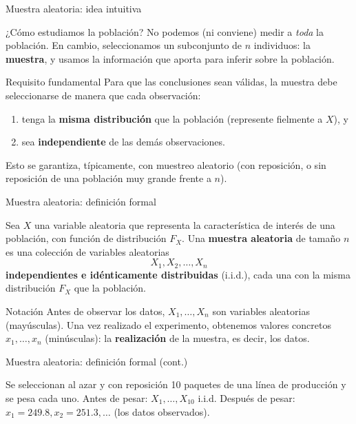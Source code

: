 \documentclass[aspectratio=169,11pt]{beamer}
\begin{document}
\begin{frame}{Muestra aleatoria: idea intuitiva}
\begin{block}{¿Cómo estudiamos la población?}
No podemos (ni conviene) medir a \emph{toda} la población. En cambio, seleccionamos un subconjunto de $n$ individuos: la \textbf{muestra}, y usamos la información que aporta para inferir sobre la población.
\end{block}

\begin{alertblock}{Requisito fundamental}
Para que las conclusiones sean válidas, la muestra debe seleccionarse de manera que cada observación:
\begin{enumerate}
\item tenga la \textbf{misma distribución} que la población (represente fielmente a $X$), y
\item sea \textbf{independiente} de las demás observaciones.
\end{enumerate}
Esto se garantiza, típicamente, con muestreo aleatorio (con reposición, o sin reposición de una población muy grande frente a $n$).
\end{alertblock}
\end{frame}

\begin{frame}{Muestra aleatoria: definición formal}
\begin{definition}
Sea $X$ una variable aleatoria que representa la característica de interés de una población, con función de distribución $F_X$. Una \textbf{muestra aleatoria} de tamaño $n$ es una colección de variables aleatorias
$$X_1, X_2, \dots, X_n$$
\textbf{independientes e idénticamente distribuidas} (i.i.d.), cada una con la misma distribución $F_X$ que la población.
\end{definition}

\begin{block}{Notación}
Antes de observar los datos, $X_1,\dots,X_n$ son variables aleatorias (mayúsculas). Una vez realizado el experimento, obtenemos valores concretos $x_1,\dots,x_n$ (minúsculas): la \textbf{realización} de la muestra, es decir, los datos.
\end{block}

\end{frame}

\begin{frame}{Muestra aleatoria: definición formal (cont.)}
\begin{example}
Se seleccionan al azar y con reposición 10 paquetes de una línea de producción y se pesa cada uno. Antes de pesar: $X_1,\dots,X_{10}$ i.i.d. Después de pesar: $x_1=249.8, x_2=251.3,\dots$ (los datos observados).
\end{example}
\end{frame}
\end{document}
